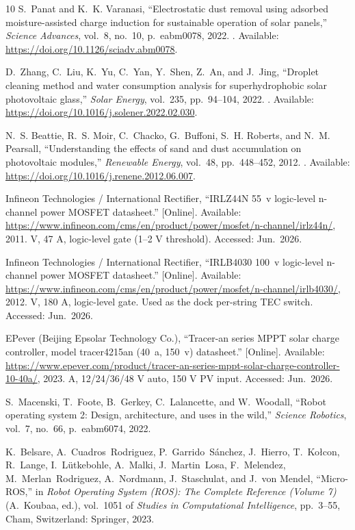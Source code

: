 \documentclass[12pt,a4paper]{report}   %
\begin{document}
\begin{thebibliography}{10}
S.~Panat and K.~K. Varanasi, ``Electrostatic dust removal using adsorbed
  moisture-assisted charge induction for sustainable operation of solar
  panels,'' {\em Science Advances}, vol.~8, no.~10, p.~eabm0078, 2022.
\newblock [Online]. Available: \url{https://doi.org/10.1126/sciadv.abm0078}.

D.~Zhang, C.~Liu, K.~Yu, C.~Yan, Y.~Shen, Z.~An, and J.~Jing, ``Droplet
  cleaning method and water consumption analysis for superhydrophobic solar
  photovoltaic glass,'' {\em Solar Energy}, vol.~235, pp.~94--104, 2022.
\newblock [Online]. Available:
  \url{https://doi.org/10.1016/j.solener.2022.02.030}.

N.~S. Beattie, R.~S. Moir, C.~Chacko, G.~Buffoni, S.~H. Roberts, and N.~M.
  Pearsall, ``Understanding the effects of sand and dust accumulation on
  photovoltaic modules,'' {\em Renewable Energy}, vol.~48, pp.~448--452, 2012.
\newblock [Online]. Available:
  \url{https://doi.org/10.1016/j.renene.2012.06.007}.

{Infineon Technologies / International Rectifier}, ``{IRLZ44N} 55~v logic-level
  n-channel power {MOSFET} datasheet.'' [Online]. Available:
  \url{https://www.infineon.com/cms/en/product/power/mosfet/n-channel/irlz44n/},
  2011.
 V, 47 A, logic-level gate (1--2 V threshold). Accessed: Jun.\
  2026.

{Infineon Technologies / International Rectifier}, ``{IRLB4030} 100~v
  logic-level n-channel power {MOSFET} datasheet.'' [Online]. Available:
  \url{https://www.infineon.com/cms/en/product/power/mosfet/n-channel/irlb4030/},
  2012.
 V, 180 A, logic-level gate. Used as the dock per-string TEC
  switch. Accessed: Jun.\ 2026.

{EPever (Beijing Epsolar Technology Co.)}, ``Tracer-an series {MPPT} solar
  charge controller, model tracer4215an (40~a, 150~v) datasheet.'' [Online].
  Available:
  \url{https://www.epever.com/product/tracer-an-series-mppt-solar-charge-controller-10-40a/},
  2023.
 A, 12/24/36/48 V auto, 150 V PV input. Accessed: Jun.\ 2026.

S.~Macenski, T.~Foote, B.~Gerkey, C.~Lalancette, and W.~Woodall, ``Robot
  operating system 2: Design, architecture, and uses in the wild,'' {\em
  Science Robotics}, vol.~7, no.~66, p.~eabm6074, 2022.

K.~Belsare, A.~Cuadros~Rodriguez, P.~Garrido~S{\'a}nchez, J.~Hierro,
  T.~Ko{\l}con, R.~Lange, I.~L{\"u}tkebohle, A.~Malki, J.~Martin~Losa,
  F.~Melendez, M.~Merlan~Rodriguez, A.~Nordmann, J.~Staschulat, and J.~von
  Mendel, ``Micro-{ROS},'' in {\em Robot Operating System (ROS): The Complete
  Reference (Volume 7)} (A.~Koubaa, ed.), vol.~1051 of {\em Studies in
  Computational Intelligence}, pp.~3--55, Cham, Switzerland: Springer, 2023.

\end{thebibliography}
\end{document}

